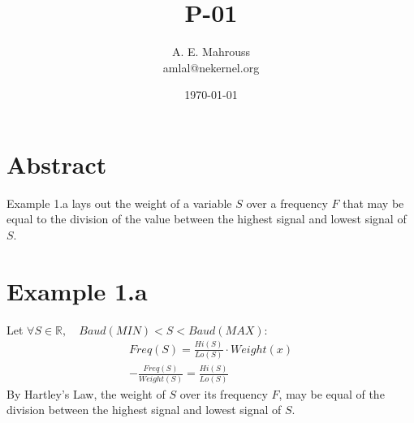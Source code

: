 \documentclass{article}
\title{P-01}
\author{A. E. Mahrouss\\amlal@nekernel.org}
\date{\today}
\begin{document}
\maketitle

\section{Abstract}
Example 1.a lays out the weight of a variable $S$ over a frequency $F$ that may be equal to the division of the value between the highest signal and lowest signal of $S$.

\section{Example 1.a}
Let
$\forall S \in \mathbb{R}, \quad Baud(MIN) < S < Baud(MAX)$:
\begin{align*}
Freq(S) = \frac{Hi(S)}{Lo(S)} \cdot Weight(x)\\
-\frac{Freq(S)}{Weight(S)} = \frac{Hi(S)}{Lo(S)}
\end{align*}
By Hartley's Law, the weight of $S$ over its frequency $F$, may be equal of the division between the highest signal and lowest signal of $S$.

\nocite{*}



\end{document}
